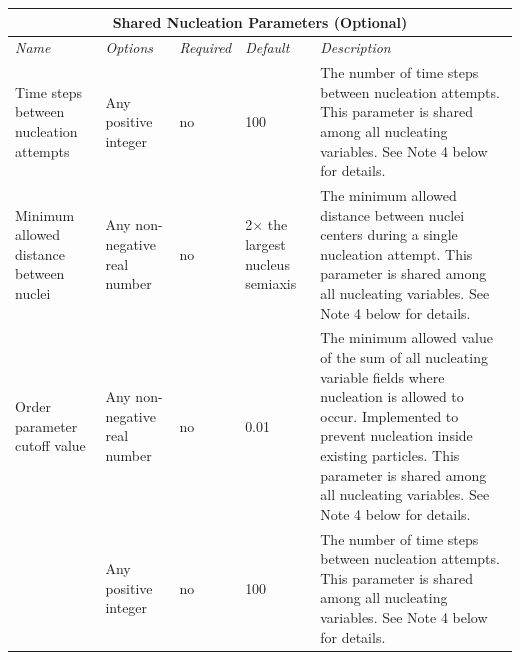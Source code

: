 \documentclass[10pt]{article} %
\begin{document}
\begin{center}
    \begin{tabular}{ | p{} | p{} | p{} | p{} | p{} |}
    \hline
      \multicolumn{5}{|c|}{\textbf{Shared Nucleation Parameters (Optional)}} \\
    \hline
    \hline
    \emph{Name} & \emph{Options} & \emph{Required} & \emph{Default} & \emph{Description} \\ \hline
    Time steps between nucleation attempts & Any positive integer & no & 100  & The number of time steps between nucleation attempts. This parameter is shared among all nucleating variables. See Note 4 below for details. \\ \hline
    Minimum allowed distance between nuclei & Any non-negative real number & no & 2$\times$ the largest nucleus semiaxis  & The minimum allowed distance between nuclei centers during a single nucleation attempt. This parameter is shared among all nucleating variables. See Note 4 below for details. \\ \hline
     Order parameter cutoff value & Any non-negative real number & no & 0.01  & The minimum allowed value of the sum of all nucleating variable fields where nucleation is allowed to occur. Implemented to prevent nucleation inside existing particles. This parameter is shared among all nucleating variables. See Note 4 below for details. \\ \hline
      & Any positive integer & no & 100  & The number of time steps between nucleation attempts. This parameter is shared among all nucleating variables. See Note 4 below for details. \\ \hline
    \end{tabular}
\end{center}
\end{document}
